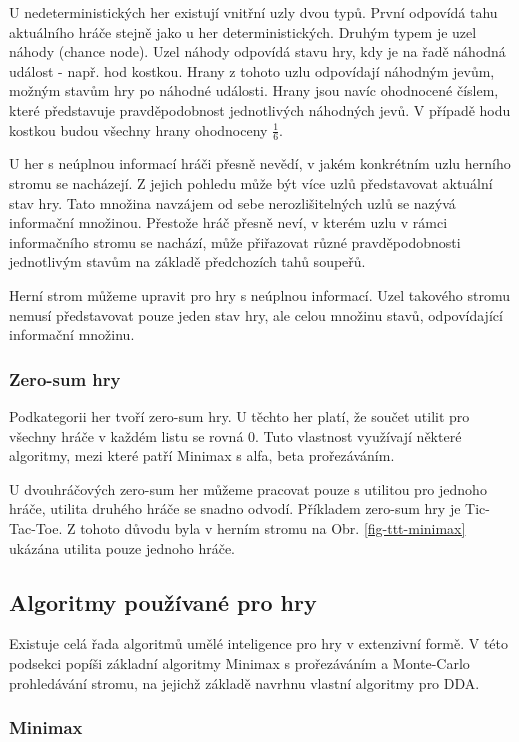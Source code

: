 U nedeterministických her existují vnitřní uzly dvou typů. První odpovídá tahu aktuálního hráče stejně jako u her deterministických. Druhým typem je uzel náhody (chance node). Uzel náhody odpovídá stavu hry, kdy je na řadě náhodná událost - např. hod kostkou. Hrany z tohoto uzlu odpovídají náhodným jevům, možným stavům hry po náhodné události. Hrany jsou navíc ohodnocené číslem, které představuje pravděpodobnost jednotlivých náhodných jevů. V případě hodu kostkou budou všechny hrany ohodnoceny $\frac{1}{6}$.

U her s neúplnou informací hráči přesně nevědí, v jakém konkrétním uzlu herního stromu se nacházejí. Z jejich pohledu může být více uzlů představovat aktuální stav hry. Tato množina navzájem od sebe nerozlišitelných uzlů se nazývá informační množinou. Přestože hráč přesně neví, v kterém uzlu v rámci informačního stromu se nachází, může přiřazovat různé pravděpodobnosti jednotlivým stavům na základě předchozích tahů soupeřů.

Herní strom můžeme upravit pro hry s neúplnou informací. Uzel takového stromu nemusí představovat pouze jeden stav hry, ale celou množinu stavů, odpovídající informační množinu.

\subsubsection{Zero-sum hry}

Podkategorii her tvoří zero-sum hry. U těchto her platí, že součet utilit pro všechny hráče v každém listu se rovná 0. Tuto vlastnost využívají některé algoritmy, mezi které patří Minimax s alfa, beta prořezáváním.

U dvouhráčových zero-sum her můžeme pracovat pouze s utilitou pro jednoho hráče, utilita druhého hráče se snadno odvodí. Příkladem zero-sum hry je Tic-Tac-Toe. Z tohoto důvodu byla v herním stromu na Obr. \ref{fig-ttt-minimax} ukázána utilita pouze jednoho hráče.

\subsection{Algoritmy používané pro hry}

Existuje celá řada algoritmů umělé inteligence pro hry v extenzivní formě. V této podsekci popíši základní algoritmy Minimax s prořezáváním a Monte-Carlo prohledávání stromu, na jejichž základě navrhnu vlastní algoritmy pro DDA.

\subsubsection{Minimax}

